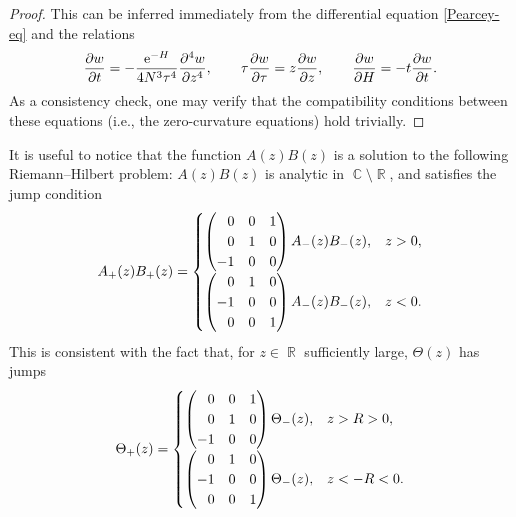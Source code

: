\documentclass[pdftex]{sigma}
\DeclareMathOperator{\CC}{\mathbb{C}}
\DeclareMathOperator{\RR}{\mathbb{R}}
\numberwithin{equation}{section}
\begin{document}
\begin{proof}
 This can be inferred immediately from the differential equation \eqref{Pearcey-eq} and the relations
 \begin{equation*}
 \frac{\partial w}{\partial t} = -\frac{{\rm e}^{-H}}{4 N^3\tau^4} \frac{\partial^4 w}{\partial z^4},\qquad \tau\frac{\partial w}{\partial \tau} = z\frac{\partial w}{\partial z},\qquad \frac{\partial w}{\partial H} = -t \frac{\partial w}{\partial t}.
 \end{equation*}
As a consistency check, one may verify that the compatibility conditions between these equations (i.e., the zero-curvature equations) hold trivially.
\end{proof}

\begin{Remark} \label{AB-matrix-remark}
 It is useful to notice that the function $A(z) B(z)$ is a solution to the following Riemann--Hilbert problem:
 $A(z) B(z)$ is analytic in $\CC\setminus\RR$, and satisfies the jump condition
 \begin{equation*}
 A_+(z) B_+(z) =
 \begin{cases}
 \begin{pmatrix}
 \hphantom{-} 0 & 0 & 1\\
 \hphantom{-} 0 & 1 & 0\\
 -1 & 0 & 0\\
 \end{pmatrix}A_-(z) B_-(z), & z > 0, \\[1.5mm]
 \begin{pmatrix}
 \hphantom{-} 0 & 1 & 0\\
 -1 & 0 & 0\\
 \hphantom{-} 0 & 0 & 1\\
 \end{pmatrix}A_-(z) B_-(z), & z < 0.
 \end{cases}
 \end{equation*}
 This is consistent with the fact that, for $z \in \RR$ sufficiently large, $\Theta(z)$ has jumps
 \begin{equation*}
 \Theta_{+}(z) =
 \begin{cases}
 \begin{pmatrix}
 \hphantom{-} 0 & 0 & 1\\
 \hphantom{-} 0 & 1 & 0\\
 -1 & 0 & 0\\
 \end{pmatrix}\Theta_{-}(z), & z > R > 0, \\[1.5mm]
 \begin{pmatrix}
 \hphantom{-} 0 & 1 & 0\\
 -1 & 0 & 0\\
 \hphantom{-} 0 & 0 & 1\\
 \end{pmatrix}\Theta_{-}(z), & z < - R < 0.
 \end{cases}
 \end{equation*}
\end{Remark}
\end{document}
